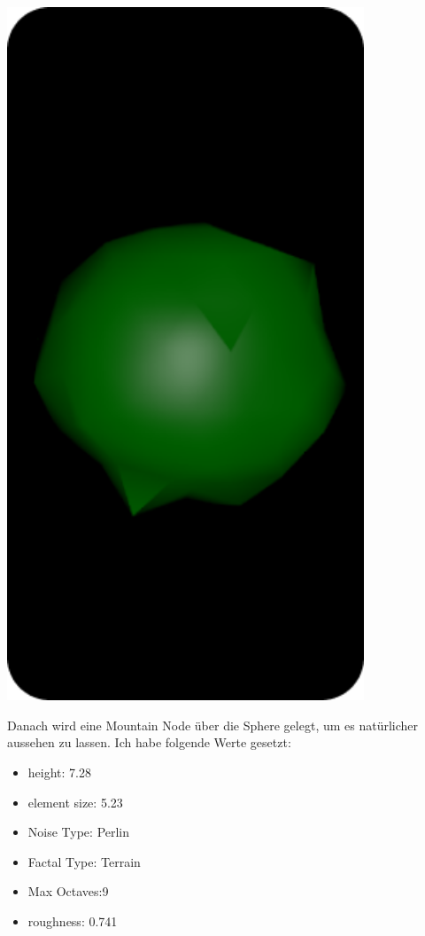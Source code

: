 \documentclass[paper=a4,fontsize=12pt,ngerman]{scrartcl}
\begin{document}
	\begin{minipage}{0.3\textwidth}
		\includegraphics[width=0.8\textwidth]{graphics/Ali8.png}
	\end{minipage}
	\begin{minipage}{0.7\textwidth}
	Danach wird eine Mountain Node über die Sphere gelegt, um es natürlicher aussehen zu lassen. Ich habe folgende Werte gesetzt: 
	\begin{itemize}
		\item height: 7.28
		\item element size: 5.23
		\item Noise Type: Perlin
		\item Factal Type: Terrain
		\item Max Octaves:9
		\item roughness: 0.741
	\end{itemize}
	\end{minipage}
\end{document}
